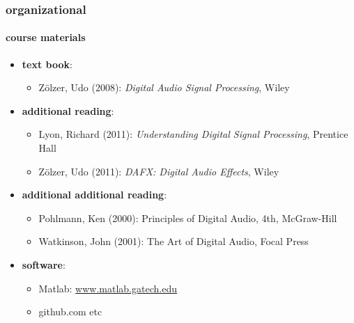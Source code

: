     \begin{frame}\frametitle{organizational}\framesubtitle{course materials}
        \begin{itemize}
            \item   \textbf{text book}:  
                \begin{itemize}
                    \item   Z\"olzer, Udo (2008): \textit{Digital Audio Signal Processing}, Wiley 
                \end{itemize}
             \pause
             \bigskip
             \item   \textbf{additional  reading}:  
                \begin{itemize}
                    \item   Lyon, Richard (2011): \textit{Understanding Digital Signal Processing}, Prentice Hall 
                    \item   Z\"olzer, Udo (2011): \textit{DAFX: Digital Audio Effects}, Wiley
                \end{itemize}
            \pause
            \bigskip
            \item   \textbf{{additional} additional reading}:
                \begin{itemize}
                    \item   Pohlmann, Ken (2000): Principles of Digital Audio, 4th, McGraw-Hill
                    \item   Watkinson, John (2001): The Art of Digital Audio, Focal Press
                \end{itemize}

            \pause
            \bigskip
            \item   \textbf{software}: 
                \begin{itemize}
                    \item   Matlab: \url{www.matlab.gatech.edu}
                    \item   github.com etc
                \end{itemize}
        \end{itemize}
    \end{frame}

